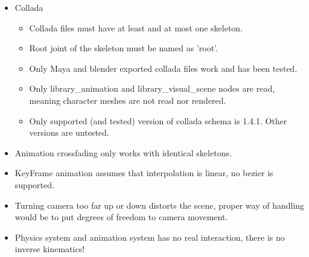 \documentclass[11pt,twoside,a4paper]{article}
\begin{document}
\begin{itemize}
  \item Collada
  \begin{itemize}
    \item Collada files must have at least and at most one skeleton.
    \item Root joint of the skeleton must be named as 'root'.
    \item Only Maya and blender exported collada files work and has been tested.
    \item Only library\_animation and library\_visual\_scene nodes are read, meaning character meshes are not read nor rendered.
    \item Only supported (and tested) version of collada schema is 1.4.1. Other versions are untested.
  \end{itemize}
  \item Animation crossfading only works with identical skeletons.
  \item KeyFrame animation assumes that interpolation is linear, no bezier is supported.
  \item Turning camera too far up or down distorts the scene, proper way of handling would be to put degrees of freedom to camera movement.
  \item Physics system and animation system has no real interaction, there is no inverse kinematics!
\end{itemize}
\end{document}
